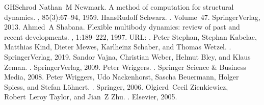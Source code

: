 \documentclass[letterpaper,10pt,german]{jupyterBook}
\begin{document}
\begin{sphinxthebibliography}{GHSchrod}
\sphinxAtStartPar
Nathan M Newmark. A method of computation for structural dynamics. , 85(3):67–94, 1959.
\sphinxAtStartPar
Hans\sphinxhyphen{}Rudolf Schwarz. . Volume 47. Springer\sphinxhyphen{}Verlag, 2013.
\sphinxAtStartPar
Ahmed A Shabana. Flexible multibody dynamics: review of past and recent developments. , 1:189–222, 1997. URL: .
\sphinxAtStartPar
Peter Stephan, Stephan Kabelac, Matthias Kind, Dieter Mewes, Karlheinz Schaber, and Thomas Wetzel. . Springer\sphinxhyphen{}Verlag, 2019.
\sphinxAtStartPar
Sandor Vajna, Christian Weber, Helmut Bley, and Klaus Zeman. . Springer\sphinxhyphen{}Verlag, 2009.
\sphinxAtStartPar
Peter Wriggers. . Springer Science \& Business Media, 2008.
\sphinxAtStartPar
Peter Wriggers, Udo Nackenhorst, Sascha Beuermann, Holger Spiess, and Stefan Löhnert. . Springer, 2006.
\sphinxAtStartPar
Olgierd Cecil Zienkiewicz, Robert Leroy Taylor, and Jian Z Zhu. . Elsevier, 2005.
\end{sphinxthebibliography}







\renewcommand{\indexname}{Stichwortverzeichnis}
\printindex
\end{document}
